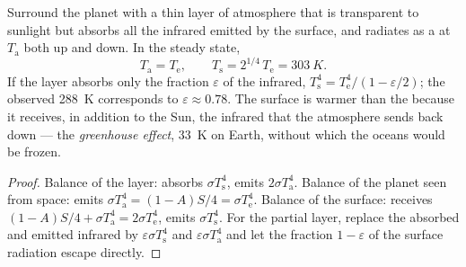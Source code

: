 \begin{proposition}\label{prop:b2:thermal-radiation:greenhouse}
Surround the planet with a thin layer of atmosphere that is transparent
to sunlight but absorbs all the infrared emitted by the surface, and
radiates as a  at $T_{\text{a}}$ both up and down. In the
steady state,
\[
T_{\text{a}} = T_{\text{e}}, \qquad
T_{\text{s}} = 2^{1/4}\,T_{\text{e}} = \qty{303}{K} .
\]
If the layer absorbs only the fraction $\varepsilon$ of the infrared,
$T_{\text{s}}^4 = T_{\text{e}}^4/(1 - \varepsilon/2)$; the observed
\qty{288}{K} corresponds to $\varepsilon \approx 0.78$. The surface is
warmer than the  because it receives, in addition
to the Sun, the infrared that the atmosphere sends back down --- the
\emph{greenhouse effect}, \qty{33}{K} on Earth,
without which the oceans would be frozen.
\end{proposition}

\begin{proof}
Balance of the layer: absorbs $\sigma T_{\text{s}}^4$, emits $2\sigma
T_{\text{a}}^4$. Balance of the planet seen from space: emits $\sigma
T_{\text{a}}^4 = (1 - A)S/4 = \sigma T_{\text{e}}^4$. Balance of the
surface: receives $(1 - A)S/4 + \sigma T_{\text{a}}^4 = 2\sigma T_{\text{e}}^4$,
emits $\sigma T_{\text{s}}^4$. For the partial layer, replace the
absorbed and emitted infrared by $\varepsilon\sigma T_{\text{s}}^4$ and
$\varepsilon\sigma T_{\text{a}}^4$ and let the fraction $1 - \varepsilon$
of the surface radiation escape directly.
\end{proof}

